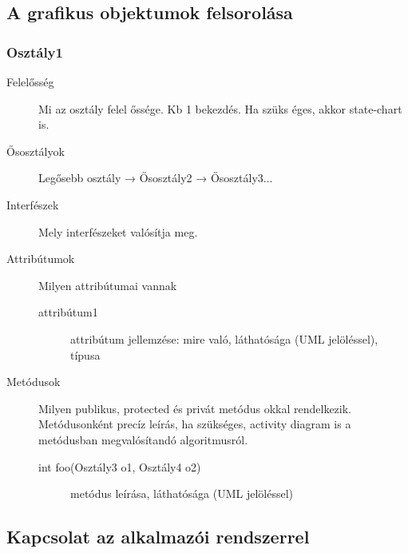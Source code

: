 	\subsection{A grafikus objektumok felsorolása}
	
		\subsubsection{Osztály1}
			\begin{description}
				\item[Felelősség] Mi az osztály felel őssége. Kb 1 bekezdés. Ha szüks éges, akkor state-chart is.
				\item[Ősosztályok] Legősebb osztály → Ősosztály2  → Ősosztály3...
				\item[Interfészek] Mely interfészeket valósítja meg.
				\item[Attribútumok] Milyen attribútumai vannak
					\begin{description}
						\item[attribútum1] attribútum jellemzése: mire való, láthatósága (UML jelöléssel), típusa 
					\end{description}
				\item[Metódusok] Milyen publikus, protected és privát  metódus okkal rendelkezik. Metódusonként precíz leírás, 
ha szükséges, activity diagram is  a metódusban megvalósítandó algoritmusról.
					\begin{description}
						\item[int foo(Osztály3 o1, Osztály4 o2)] metódus leírása, láthatósága (UML jelöléssel)
					\end{description}
			\end{description}

	\clearpage
	\subsection{Kapcsolat az alkalmazói rendszerrel}

